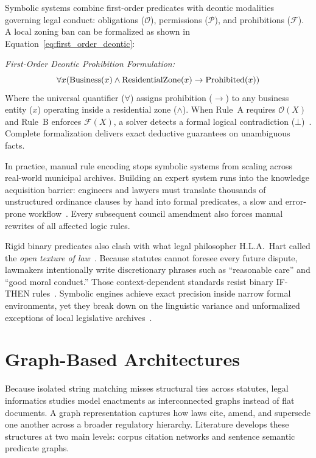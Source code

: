     Symbolic systems combine first-order predicates with deontic modalities governing legal conduct: obligations ($\mathcal{O}$), permissions ($\mathcal{P}$), and prohibitions ($\mathcal{F}$). A local zoning ban can be formalized as shown in Equation~\eqref{eq:first_order_deontic}:

    \noindent\textit{First-Order Deontic Prohibition Formulation:}
    \begin{equation}
        \forall x (\text{Business}(x) \land \text{ResidentialZone}(x) \rightarrow \text{Prohibited}(x))
        \label{eq:first_order_deontic}
        \eqcaption{First-Order Deontic Prohibition Formulation}
    \end{equation}
    \noindent Where the universal quantifier ($\forall$) assigns prohibition ($\rightarrow$) to any business entity ($x$) operating inside a residential zone ($\land$). When Rule~A requires $\mathcal{O}(X)$ and Rule~B enforces $\mathcal{F}(X)$, a solver detects a formal logical contradiction ($\bot$)~\cite{athan2013legalruleml}. Complete formalization delivers exact deductive guarantees on unambiguous facts.

        In practice, manual rule encoding stops symbolic systems from scaling across real-world municipal archives. Building an expert system runs into the knowledge acquisition barrier: engineers and lawyers must translate thousands of unstructured ordinance clauses by hand into formal predicates, a slow and error-prone workflow~\cite{lucos2025neurosymbolic}. Every subsequent council amendment also forces manual rewrites of all affected logic rules.

        Rigid binary predicates also clash with what legal philosopher H.L.A.~Hart called the \textit{open texture of law}~\cite{hart1961concept}. Because statutes cannot foresee every future dispute, lawmakers intentionally write discretionary phrases such as ``reasonable care'' and ``good moral conduct.'' Those context-dependent standards resist binary IF-THEN rules~\cite{ashley2017artificial}. Symbolic engines achieve exact precision inside narrow formal environments, yet they break down on the linguistic variance and unformalized exceptions of local legislative archives~\cite{zhong2020how}.


    
\section{Graph-Based Architectures}
Because isolated string matching misses structural ties across statutes, legal informatics studies model enactments as interconnected graphs instead of flat documents. A graph representation captures how laws cite, amend, and supersede one another across a broader regulatory hierarchy. Literature develops these structures at two main levels: corpus citation networks and sentence semantic predicate graphs.

